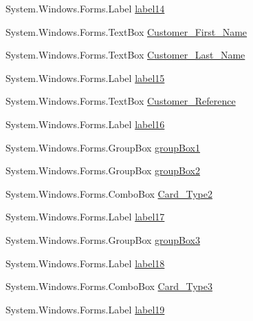 \begin{DoxyCompactItemize}
System.\+Windows.\+Forms.\+Label \mbox{\hyperlink{class_cert_complete_1_1_test___creation___form_a0a099e6594f17696ce7812cecad68b87}{label14}}
\item 
System.\+Windows.\+Forms.\+Text\+Box \mbox{\hyperlink{class_cert_complete_1_1_test___creation___form_a5db8f2730be71bb87aa68c277b048368}{Customer\+\_\+\+First\+\_\+\+Name}}
\item 
System.\+Windows.\+Forms.\+Text\+Box \mbox{\hyperlink{class_cert_complete_1_1_test___creation___form_a8705e231577a186b8280407a5d8fba40}{Customer\+\_\+\+Last\+\_\+\+Name}}
\item 
System.\+Windows.\+Forms.\+Label \mbox{\hyperlink{class_cert_complete_1_1_test___creation___form_ace4e383bd774512895502a9d08ed7c56}{label15}}
\item 
System.\+Windows.\+Forms.\+Text\+Box \mbox{\hyperlink{class_cert_complete_1_1_test___creation___form_a3c436bf398b217cc295892a942f0c928}{Customer\+\_\+\+Reference}}
\item 
System.\+Windows.\+Forms.\+Label \mbox{\hyperlink{class_cert_complete_1_1_test___creation___form_a6fda2ca1e581ea5e384baf8d91864cff}{label16}}
\item 
System.\+Windows.\+Forms.\+Group\+Box \mbox{\hyperlink{class_cert_complete_1_1_test___creation___form_a5b27770fc2842ac68f21e654d9b43eb2}{group\+Box1}}
\item 
System.\+Windows.\+Forms.\+Group\+Box \mbox{\hyperlink{class_cert_complete_1_1_test___creation___form_af0e7f6dd70004f11675a0676634a09bb}{group\+Box2}}
\item 
System.\+Windows.\+Forms.\+Combo\+Box \mbox{\hyperlink{class_cert_complete_1_1_test___creation___form_a9ccd8f6b806336cd652e4e742088f7c8}{Card\+\_\+\+Type2}}
\item 
System.\+Windows.\+Forms.\+Label \mbox{\hyperlink{class_cert_complete_1_1_test___creation___form_ad144685b6959823821a959f3a4cbf608}{label17}}
\item 
System.\+Windows.\+Forms.\+Group\+Box \mbox{\hyperlink{class_cert_complete_1_1_test___creation___form_ae87a1f8aada8bff635cd619cdff450ec}{group\+Box3}}
\item 
System.\+Windows.\+Forms.\+Label \mbox{\hyperlink{class_cert_complete_1_1_test___creation___form_a0fabc8b98aaa5189c31c8542ee1d66e5}{label18}}
\item 
System.\+Windows.\+Forms.\+Combo\+Box \mbox{\hyperlink{class_cert_complete_1_1_test___creation___form_aea72594fa54e9fa2724fa8eeb7b9b363}{Card\+\_\+\+Type3}}
\item 
System.\+Windows.\+Forms.\+Label \mbox{\hyperlink{class_cert_complete_1_1_test___creation___form_a516dabddbeb8991efddc9aa0ec20bda7}{label19}}

\end{DoxyCompactItemize}
